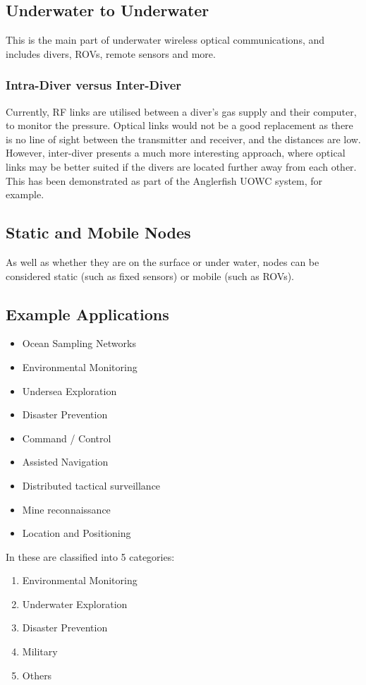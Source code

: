 \subsection{Underwater to Underwater}
This is the main part of underwater wireless optical communications, and
includes divers, \ac{ROV}s, remote sensors and more.

\subsubsection{Intra-Diver versus Inter-Diver}
Currently, \ac{RF} links are utilised between a diver's gas supply and
their computer, to monitor the pressure. Optical links would not be
a good replacement as there is no line of sight between the transmitter
and receiver, and the distances are low. However, inter-diver presents
a much more interesting approach, where optical links may be better suited
if the divers are located further away from each other. This has been
demonstrated as part of the Anglerfish \ac{UOWC} system, for example.

\subsection{Static and Mobile Nodes}
As well as whether they are on the surface or under water, nodes can be
considered static (such as fixed sensors) or mobile (such as \ac{ROV}s).

\subsection{Example Applications}
\begin{itemize}
\item{Ocean Sampling Networks}
\item{Environmental Monitoring}
\item{Undersea Exploration}
\item{Disaster Prevention}
\item{Command / Control}
\item{Assisted Navigation}
\item{Distributed tactical surveillance}
\item{Mine reconnaissance}
\item{Location and Positioning}
\end{itemize}

In \cite{iout_comprehensive} these are classified into 5 categories:
\begin{enumerate}
\item{Environmental Monitoring}
\item{Underwater Exploration}
\item{Disaster Prevention}
\item{Military}
\item{Others}
\end{enumerate}